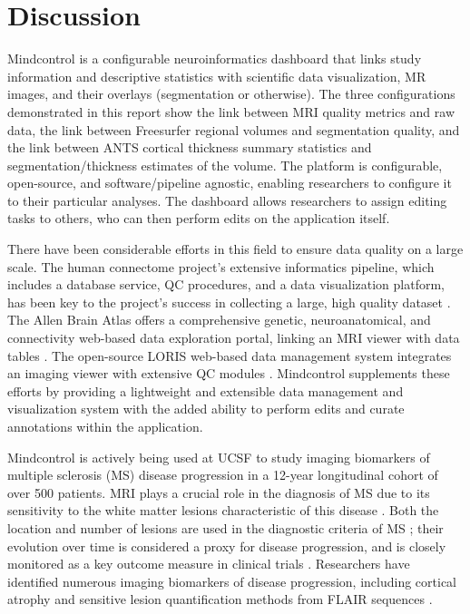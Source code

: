 \section{Discussion}

Mindcontrol is a configurable neuroinformatics dashboard that links study information and descriptive statistics with scientific data visualization, MR images, and their overlays (segmentation or otherwise). The three configurations demonstrated in this report show the link between MRI quality metrics and raw data, the link between Freesurfer regional volumes and segmentation quality, and the link between ANTS cortical thickness summary statistics and segmentation/thickness estimates of the volume. The platform is configurable, open-source, and software/pipeline agnostic, enabling researchers to configure it to their particular analyses. The dashboard allows researchers to assign editing tasks to others, who can then perform edits on the application itself. 

There have been considerable efforts in this field to ensure data quality on a large scale. The human connectome project's extensive informatics pipeline, which includes a database service, QC procedures, and a data visualization platform, has been key to the project's success in collecting a large, high quality dataset \cite{Marcus_2013}. The Allen Brain Atlas offers a comprehensive genetic, neuroanatomical, and connectivity web-based data exploration portal, linking an MRI viewer with data tables \cite{Sunkin_2012}. The open-source LORIS web-based data management system integrates an imaging viewer with extensive QC modules \cite{Das_2012}. Mindcontrol supplements these efforts by providing a lightweight and extensible data management and visualization system with the added ability to perform edits and curate annotations within the application. 

Mindcontrol is actively being used at UCSF to study imaging biomarkers of multiple sclerosis (MS) disease progression in a 12-year longitudinal cohort of over 500 patients. MRI plays a crucial role in the diagnosis of MS due to its sensitivity to the white matter lesions characteristic of this disease \cite{ge2006multiple}. Both the location and number of lesions are used in the diagnostic criteria of MS \cite{mcdonald2001recommended}; their evolution over time is considered a proxy for disease progression, and is closely monitored as a key outcome measure in clinical trials \cite{ge2000glatiramer}. Researchers have identified numerous imaging biomarkers of disease progression, including cortical atrophy \cite{fisher2008gray} and sensitive lesion quantification methods from FLAIR sequences \cite{Schmidt_2012}. 

